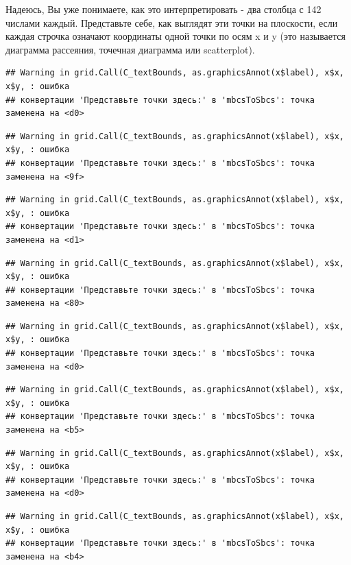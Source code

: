 \documentclass[]{book}
\begin{document}
Надеюсь, Вы уже понимаете, как это интерпретировать - два столбца с 142
числами каждый. Представьте себе, как выглядят эти точки на плоскости,
если каждая строчка означают координаты одной точки по осям x и y (это
называется диаграмма рассеяния, точечная диаграмма или scatterplot).

\begin{verbatim}
## Warning in grid.Call(C_textBounds, as.graphicsAnnot(x$label), x$x, x$y, : ошибка
## конвертации 'Представьте точки здесь:' в 'mbcsToSbcs': точка заменена на <d0>
\end{verbatim}

\begin{verbatim}
## Warning in grid.Call(C_textBounds, as.graphicsAnnot(x$label), x$x, x$y, : ошибка
## конвертации 'Представьте точки здесь:' в 'mbcsToSbcs': точка заменена на <9f>
\end{verbatim}

\begin{verbatim}
## Warning in grid.Call(C_textBounds, as.graphicsAnnot(x$label), x$x, x$y, : ошибка
## конвертации 'Представьте точки здесь:' в 'mbcsToSbcs': точка заменена на <d1>
\end{verbatim}

\begin{verbatim}
## Warning in grid.Call(C_textBounds, as.graphicsAnnot(x$label), x$x, x$y, : ошибка
## конвертации 'Представьте точки здесь:' в 'mbcsToSbcs': точка заменена на <80>
\end{verbatim}

\begin{verbatim}
## Warning in grid.Call(C_textBounds, as.graphicsAnnot(x$label), x$x, x$y, : ошибка
## конвертации 'Представьте точки здесь:' в 'mbcsToSbcs': точка заменена на <d0>
\end{verbatim}

\begin{verbatim}
## Warning in grid.Call(C_textBounds, as.graphicsAnnot(x$label), x$x, x$y, : ошибка
## конвертации 'Представьте точки здесь:' в 'mbcsToSbcs': точка заменена на <b5>
\end{verbatim}

\begin{verbatim}
## Warning in grid.Call(C_textBounds, as.graphicsAnnot(x$label), x$x, x$y, : ошибка
## конвертации 'Представьте точки здесь:' в 'mbcsToSbcs': точка заменена на <d0>
\end{verbatim}

\begin{verbatim}
## Warning in grid.Call(C_textBounds, as.graphicsAnnot(x$label), x$x, x$y, : ошибка
## конвертации 'Представьте точки здесь:' в 'mbcsToSbcs': точка заменена на <b4>
\end{verbatim}
\end{document}
